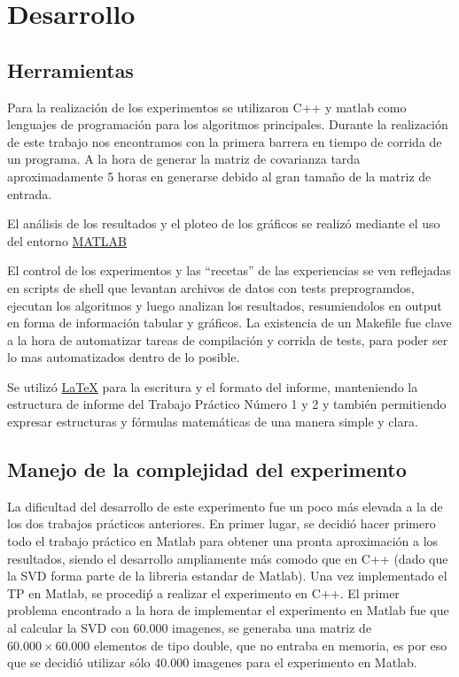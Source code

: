 \section{Desarrollo}

\subsection{Herramientas}

Para la realizaci\'on de los experimentos se utilizaron C++ y matlab como lenguajes de
programaci\'on para los algoritmos principales. Durante la realizaci\'on de este trabajo nos encontramos con
la primera barrera en tiempo de corrida de un programa. A la hora de generar la matriz de covarianza tarda
aproximadamente 5 horas en generarse debido al gran tama\~no de la matriz de entrada.

El an\'alisis de los resultados y el ploteo de los gr\'aficos se realiz\'o
mediante el uso del entorno \href{http://www.matlab.com/}{MATLAB}

El control de los experimentos y las ``recetas'' de las experiencias se ven
reflejadas en scripts de shell que levantan archivos de datos con tests
preprogramdos, ejecutan los algoritmos y luego analizan los resultados,
resumiendolos en output en forma de informaci\'on tabular y gr\'aficos.
La existencia de un Makefile fue clave a la hora de automatizar tareas de
compilaci\'on y corrida de tests, para poder ser lo mas automatizados dentro de
lo posible.

Se utiliz\'o \href{http://www.latex-project.org/}{\LaTeX} para la escritura y el formato del informe,
manteniendo la estructura de informe del Trabajo Pr\'actico N\'umero 1 y 2 y tambi\'en
permitiendo expresar estructuras y f\'ormulas matem\'aticas de una manera simple y clara.

\subsection{Manejo de la complejidad del experimento}

La dificultad del desarrollo de este experimento fue un poco m\'as elevada a la de los dos
trabajos pr\'acticos anteriores.
En primer lugar, se decidi\'o hacer primero todo el trabajo pr\'actico en Matlab para obtener
una pronta aproximaci\'on a los resultados, siendo el desarrollo ampliamente m\'as comodo que
en C++ (dado que la SVD forma parte de la libreria estandar de Matlab). Una vez implementado
el TP en Matlab, se procedi\'p a realizar el experimento en C++. El primer problema encontrado
a la hora de implementar el experimento en Matlab fue que al calcular la SVD con 60.000 imagenes,
se generaba una matriz de $60.000 \times 60.000$ elementos de tipo double, que no entraba en
memoria, es por eso que se decidi\'o utilizar s\'olo 40.000 imagenes para el experimento en Matlab.

